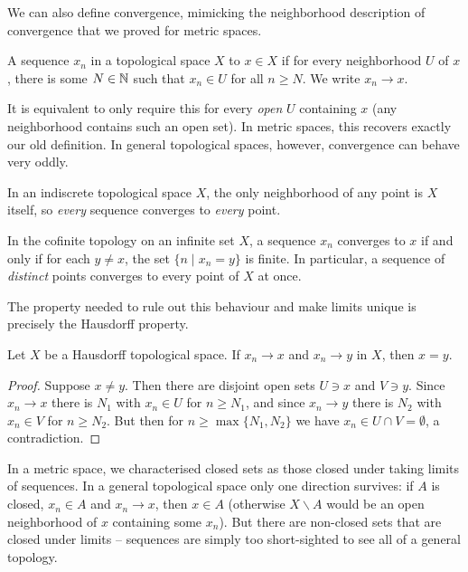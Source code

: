 \documentclass[a4paper]{scrartcl}
\begin{document}
We can also define convergence, mimicking the neighborhood description of convergence that we proved for metric spaces.

\begin{definition}[Convergence]
    A sequence $x_n$ in a topological space $X$  to $x \in X$ if for every neighborhood $U$ of $x$, there is some $N \in \mathbb{N}$ such that $x_n \in U$ for all $n \geq N$. We write $x_n \rightarrow x$.
\end{definition}

It is equivalent to only require this for every \emph{open} $U$ containing $x$ (any neighborhood contains such an open set). In metric spaces, this recovers exactly our old definition. In general topological spaces, however, convergence can behave very oddly.

\begin{example}
    In an indiscrete topological space $X$, the only neighborhood of any point is $X$ itself, so \emph{every} sequence converges to \emph{every} point.

    In the cofinite topology on an infinite set $X$, a sequence $x_n$ converges to $x$ if and only if for each $y \neq x$, the set $\{n \mid x_n = y\}$ is finite. In particular, a sequence of \emph{distinct} points converges to every point of $X$ at once.
\end{example}

The property needed to rule out this behaviour and make limits unique is precisely the Hausdorff property.

\begin{proposition}
    Let $X$ be a Hausdorff topological space. If $x_n \rightarrow x$ and $x_n \rightarrow y$ in $X$, then $x = y$.
\end{proposition}
\begin{proof}
    Suppose $x \neq y$. Then there are disjoint open sets $U \ni x$ and $V \ni y$. Since $x_n \rightarrow x$ there is $N_1$ with $x_n \in U$ for $n \geq N_1$, and since $x_n \rightarrow y$ there is $N_2$ with $x_n \in V$ for $n \geq N_2$. But then for $n \geq \max\{N_1, N_2\}$ we have $x_n \in U \cap V = \emptyset$, a contradiction.
\end{proof}

\begin{remark}
    In a metric space, we characterised closed sets as those closed under taking limits of sequences. In a general topological space only one direction survives: if $A$ is closed, $x_n \in A$ and $x_n \rightarrow x$, then $x \in A$ (otherwise $X \backslash A$ would be an open neighborhood of $x$ containing some $x_n$). But there are non-closed sets that are closed under limits -- sequences are simply too short-sighted to see all of a general topology.
\end{remark}
\end{document}
